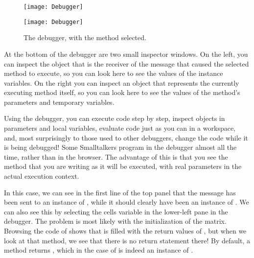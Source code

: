 \documentclass[a4paper,10pt,twoside]{book}
\begin{document}
\begin{figure}[ht]
\ifluluelse
	{\centerline {\texttt{[image: Debugger]}}}
	{\centerline {\texttt{[image: Debugger]}}}
\caption{The debugger, with the method   selected.
\label{fig:debugToggle}}
\end{figure}

At the bottom of the debugger are two small inspector windows.
On the left, you can inspect the object that is the receiver of the message that caused the selected method to execute, so you can look here to see the values of the instance variables.
On the right you can inspect an object that represents the currently executing method itself, so you can look here to see the values of the method's parameters and temporary variables.

Using the debugger, you can execute code step by step, inspect objects in parameters and local variables, evaluate code just as you can in a workspace, and, most surprisingly to those used to other debuggers, change the code while it is being debugged!
Some Smalltalkers program in the debugger almost all the time, rather than in the browser.
The advantage of this is that you see the method that you are writing as it will be executed, with real parameters in the actual execution context.

In this case, we can see in the first line of the top panel that the  message has been sent to an instance of , while it should clearly have been an instance of .
We can also see this by selecting the cells variable in the lower-left pane in the debugger.
The problem is most likely with the initialization of the  matrix.
Browsing the code of  shows that  is filled with the return values of , but when we look at that method, we see that there is no return statement there!
By default, a method returns , which in the case of  is indeed an instance of .
\end{document}
